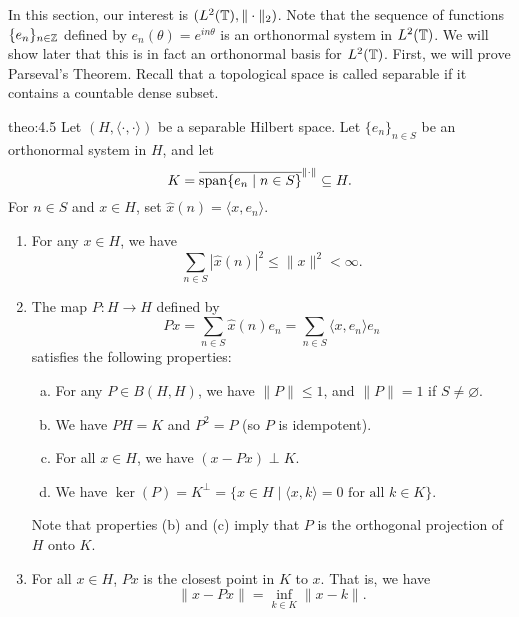 In this section, our interest is $(L^2(\mathbb{T}), \|\cdot\|_2)$. 
Note that the sequence of functions $\{e_n\}_{n\in \mathbb{Z}}$ defined by 
$e_n(\theta) = e^{in\theta}$ is an orthonormal system in $L^2(\mathbb{T})$. We will 
show later that this is in fact an orthonormal basis for $L^2(\mathbb{T})$. First, 
we will prove Parseval's Theorem. Recall that a topological space is 
called separable if it contains a countable dense subset. 

\begin{theo}{theo:4.5}
    Let $(H, \langle \cdot, \cdot \rangle)$ be a separable Hilbert space. 
    Let $\{e_n\}_{n\in S}$ be an orthonormal system in $H$, and let 
    \[ K = \overline{\operatorname{span}\{e_n \mid n \in S\}}^{\|\cdot\|} \subseteq H. \] 
    For $n \in S$ and $x \in H$, set $\hat x(n) = \langle x, e_n \rangle$. 
    \begin{enumerate}[(1)]
        \item For any $x \in H$, we have 
        \[ \sum_{n\in S} |\hat x(n)|^2 \leq \|x\|^2 < \infty. \] 
        \item The map $P : H \to H$ defined by 
        \[ Px = \sum_{n\in S} \hat x(n) e_n = \sum_{n\in S} 
        \langle x, e_n \rangle e_n \] 
        satisfies the following properties: 
        \begin{enumerate}[(a)]
            \item For any $P \in B(H, H)$, we have $\|P\| \leq 1$, 
            and $\|P\| = 1$ if $S \neq \varnothing$. 
            \item We have $PH = K$ and $P^2 = P$ (so $P$ is idempotent). 
            \item For all $x \in H$, we have $(x - Px) \perp K$. 
            \item We have $\ker(P) = K^\perp = \{x \in H \mid \langle x, k 
            \rangle = 0 \text{ for all } k \in K\}$. 
        \end{enumerate}
        Note that properties (b) and (c) imply that $P$ is the orthogonal 
        projection of $H$ onto $K$. 
        \item For all $x \in H$, $Px$ is the closest point in $K$ to $x$. 
        That is, we have 
        \[ \|x - Px\| = \inf_{k\in K} \|x - k\|. \] 
    \end{enumerate}
\end{theo}

